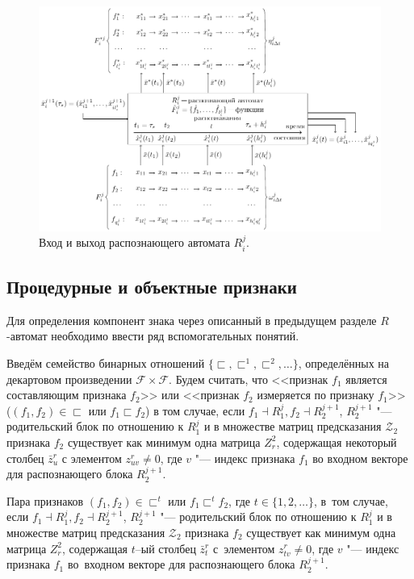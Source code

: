 \documentclass[a4paper, 12pt]{article}
\theoremstyle{plain}
\begin{document}
	\begin{figure}[H]
		\centering
		\includegraphics[width=1.0\linewidth]{rb_io}
		\caption{Вход и выход распознающего автомата $R_i^j$.}
		\label{fig:rb_io}
	\end{figure}
	
	\subsection{Процедурные и объектные признаки}
		Для определения компонент знака через описанный в предыдущем разделе $R$-автомат необходимо ввести ряд вспомогательных понятий. 
		
		Введём семейство бинарных отношений $\{\sqsubset,\sqsubset^1,\sqsubset^2,\dots\}$, определённых на декартовом произведении $\mathcal F\times \mathcal F$. Будем считать, что <<признак $f_1$ является составляющим признака $f_2$>> или <<признак $f_2$ измеряется по признаку $f_1$>> ($(f_1,f_2 )\in\sqsubset$ или $f_1\sqsubset f_2$) в том случае, если $f_1\dashv R_1^j, f_2\dashv R_2^{j+1}$, $R_2^{j+1}$ "--- родительский блок по отношению к $R_1^j$ и в множестве матриц предсказания $\mathcal Z_2$ признака $f_2$ существует как минимум одна матрица $Z_r^2$, содержащая некоторый столбец $\bar z_u^r$ с элементом $z_{uv}^r\not=0$, где $v$ "--- индекс признака $f_1$ во входном векторе для распознающего блока $R_2^{j+1}$.
		
		Пара признаков $(f_1,f_2)\in\sqsubset^t$ или $f_1\sqsubset^t f_2$, где $t\in\{1,2,\dots\}$, в~том случае, если $f_1\dashv R_1^j, f_2\dashv R_2^{j+1}$, $R_2^{j+1}$ "--- родительский блок по отношению к $R_1^j$ и в множестве матриц предсказания $\mathcal Z_2$ признака $f_2$ существует как минимум одна матрица $Z_r^2$, содержащая $t$–ый столбец $\bar z_t^r$ с~элементом $z_{tv}^r\not=0$, где $v$ "--- индекс признака $f_1$ во~входном векторе для распознающего блока $R_2^{j+1}$.
		
\end{document}
